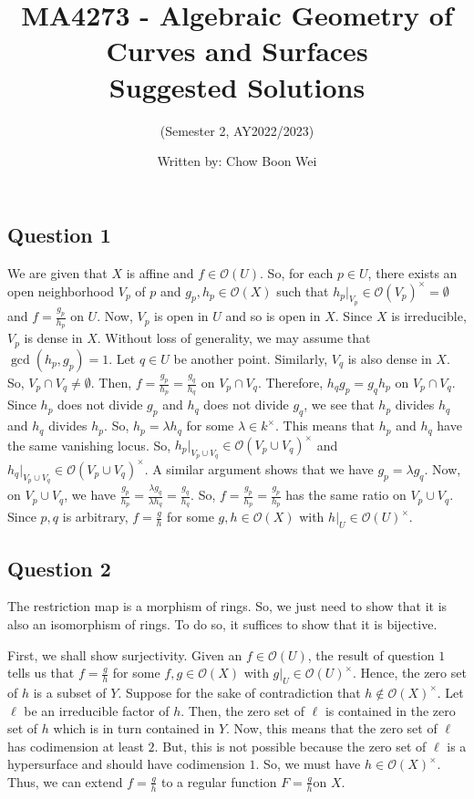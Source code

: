 \documentclass{article}
\title{MA4273 - Algebraic Geometry of Curves and Surfaces \\Suggested Solutions}
\author{(Semester 2, AY2022/2023)}
\date{Written by: Chow Boon Wei}
\begin{document}
\maketitle

\subsection*{Question 1}
We are given that $X$ is affine and $f\in \mathcal{O}(U)$.
So, for each $p\in U$, there exists an open neighborhood $V_p$ of $p$ and $g_p,h_p\in \mathcal{O}(X)$ 
such that $h_p\big|_{V_p} \in \mathcal{O}(V_p)^\times = \emptyset$ and $f=\frac{g_p}{h_p}$ on $U$. 
Now, $V_p$ is open in $U$ and so is open in $X$. Since $X$ is irreducible, $V_p$ is dense in $X$. 
Without loss of generality, we may assume that $\gcd(h_p,g_p)=1$. 
Let $q\in U$ be another point. Similarly, $V_q$ is also dense in $X$. So, $V_p \cap V_q \neq \emptyset$. 
Then, $f=\frac{g_p}{h_p}=\frac{g_q}{h_q}$ on $V_p \cap V_q$. 
Therefore, $h_qg_p=g_qh_p$ on $V_p \cap V_q$. Since $h_p$ does not divide $g_p$ and 
$h_q$ does not divide $g_q$, we see that $h_p$ divides $h_q$ and $h_q$ divides $h_p$. So, $h_p = \lambda h_q$ 
for some $\lambda \in k^\times$. This means that $h_p$ and $h_q$ have the same vanishing locus. So, 
$h_p\big|_{V_p \cup V_q} \in \mathcal{O}(V_p \cup V_q)^\times$ and 
$h_q\big|_{V_p \cup V_q} \in \mathcal{O}(V_p \cup V_q)^\times$.
A similar argument shows that we have $g_p = \lambda g_q$. Now, on $V_p \cup V_q$, we have 
$\frac{g_p}{h_p} = \frac{\lambda g_q}{\lambda h_q} = \frac{g_q}{h_q}$.
So, $f = \frac{g_p}{h_p} = \frac{g_p}{h_p}$ has the same ratio on $V_p \cup V_q$. 
Since $p,q$ is arbitrary, $f=\frac{g}{h}$ for some $g,h \in \mathcal{O}(X)$ with 
$h\big|_U \in \mathcal{O}(U)^\times$. 
\subsection*{Question 2}
The restriction map is a morphism of rings. So, we just need to show that it is also an isomorphism of 
rings. To do so, it suffices to show that it is bijective. 

First, we shall show surjectivity. 
Given an $f\in \mathcal{O}(U)$, the result of question $1$ tells us that $f=\frac{g}{h}$ for 
some $f,g\in \mathcal{O}(X)$ with $g\big|_U \in \mathcal{O}(U)^\times$. Hence, the zero set of $h$ 
is a subset of $Y$. Suppose for the sake of contradiction that $h \notin \mathcal{O}(X)^\times$.
Let $\ell$ be an irreducible factor of $h$. Then, the zero set of $\ell$ is 
contained in the zero set of $h$ which is in turn contained in $Y$. Now, this means that the 
zero set of $\ell$ has codimension at least $2$. But, this is not possible because the zero set 
of $\ell$ is a hypersurface and should have codimension $1$. So, we must have $h \in \mathcal{O}(X)^\times$. 
Thus, we can extend $f=\frac{g}{h}$ to a regular function $F=\frac{g}{h}$on $X$. 
\end{document}
